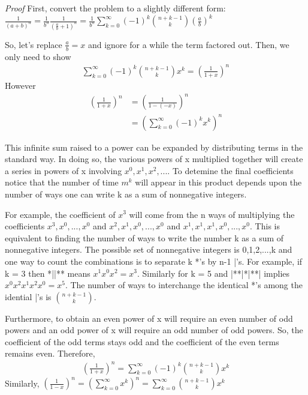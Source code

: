 \documentclass[10pt,]{book}
\makeatletter
\renewcommand*{\proofname}{Proof}
\renewenvironment{proof}[1][\proofname]{\par
  \pushQED{\qed}%
  \normalfont \topsep6\p@\@plus6\p@\relax
  \trivlist
  \item\relax
    {\itshape
    #1\@addpunct{.}}\hspace\labelsep\ignorespaces
}{%
  \popQED\endtrivlist\@endpefalse
}
\numberwithin{equation}{section}
\makeatother
\begin{document}
\begin{proof}\hypertarget{proof-48}{}
\hypertarget{p-900}{}%
First, convert the problem to a slightly different form: \(\frac{1}{(a+b)^n} = \frac{1}{b^n} \frac{1}{(\frac{a}{b}+1)^n} 
= \frac{1}{b^n} \sum_{k=0}^{\infty} {(-1)^k \binom{n + k - 1}{k} \left ( \frac{a}{b} \right ) ^k}\)%
\par
\hypertarget{p-901}{}%
So, let's replace \(\frac{a}{b} = x\) and ignore for a while the term factored out. Then, we only need to show%
\begin{gather*}
\sum_{k=0}^{\infty} {(-1)^k \binom{n + k - 1}{k} x^k} = \left ( \frac{1}{1+x} \right )^n 
\end{gather*}
However%
\begin{align*}
\left ( \frac{1}{1+x} \right )^n & = \left ( \frac{1}{1 - (-x)} \right )^n \\
& = \left ( \sum_{k=0}^{\infty} {(-1)^k x^k} \right )^n
\end{align*}
%
\par
\hypertarget{p-902}{}%
This infinite sum raised to a power can be expanded by distributing terms in the standard way. In doing so, the various powers of x multiplied together will create a series in powers of x involving \(x^0, x^1, x^2, ...\). To detemine the final coefficients notice that the number of time \(m^k\) will appear in this product depends upon the number of ways one can write k as a sum of nonnegative integers.%
\par
\hypertarget{p-903}{}%
For example, the coefficient of \(x^3\) will come from the n ways of multiplying the coefficients \(x^3, x^0, ..., x^0\) and \(x^2, x^1, x^0, ..., x^0\) and \(x^1, x^1, x^1, x^0,..., x^0\). This is equivalent to finding the number of ways to write the number k as a sum of nonnegative integers. The possible set of nonnegative integers is {0,1,2,...,k} and one way to count the combinations is to separate k *'s by n-1 |'s.  For example, if k = 3 then *||** means \(x^1 x^0 x^2 = x^3\). Similarly for k = 5 and |**|*|**| implies \(x^0 x^2 x^1 x^2 x^0 = x^5\). The number of ways to interchange the identical *'s among the idential |'s is \(\binom{n+k-1}{k}\).%
\par
\hypertarget{p-904}{}%
Furthermore, to obtain an even power of x will require an even number of odd powers and an odd power of x will require an odd number of odd powers. So, the coefficient of the odd terms stays odd and the coefficient of the even terms remains even. Therefore,%
\begin{gather*}
\left ( \frac{1}{1+x} \right )^n = \sum_{k=0}^{\infty} {(-1)^k \binom{n + k - 1}{k} x^k}
\end{gather*}
Similarly, \(\left ( \frac{1}{1-x} \right )^n = \left ( \sum_{k=0}^{\infty} {x^k} \right )^n = \sum_{k=0}^{\infty} {\binom{n + k - 1}{k} x^k}\)%
\end{proof}
\end{document}
